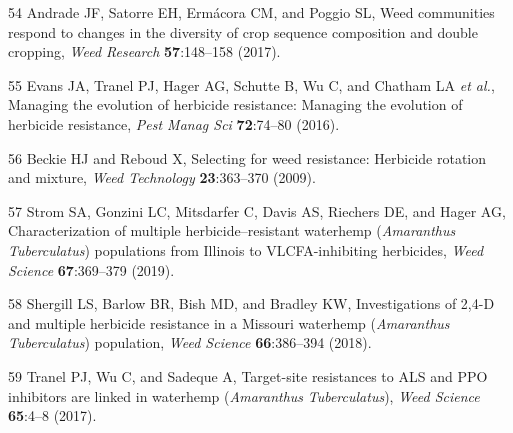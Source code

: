 \documentclass[
  12pt,
  a4paper]{article}
\begin{document}
\leavevmode\hypertarget{ref-andrade_weed_2017}{}%
54 Andrade JF, Satorre EH, Ermácora CM, and Poggio SL, Weed communities
respond to changes in the diversity of crop sequence composition and
double cropping, \emph{Weed Research} \textbf{57}:148--158 (2017).

\leavevmode\hypertarget{ref-evans_managing_2016}{}%
55 Evans JA, Tranel PJ, Hager AG, Schutte B, Wu C, and Chatham LA
\emph{et al.}, Managing the evolution of herbicide resistance: Managing
the evolution of herbicide resistance, \emph{Pest Manag Sci}
\textbf{72}:74--80 (2016).

\leavevmode\hypertarget{ref-beckie_selecting_2009}{}%
56 Beckie HJ and Reboud X, Selecting for weed resistance: Herbicide
rotation and mixture, \emph{Weed Technology} \textbf{23}:363--370
(2009).

\leavevmode\hypertarget{ref-strom_characterization_2019}{}%
57 Strom SA, Gonzini LC, Mitsdarfer C, Davis AS, Riechers DE, and Hager
AG, Characterization of multiple herbicide--resistant waterhemp
(\emph{Amaranthus} \emph{Tuberculatus}) populations from Illinois to
VLCFA-inhibiting herbicides, \emph{Weed Science} \textbf{67}:369--379
(2019).

\leavevmode\hypertarget{ref-shergill_investigations_2018}{}%
58 Shergill LS, Barlow BR, Bish MD, and Bradley KW, Investigations of
2,4-D and multiple herbicide resistance in a Missouri waterhemp
(\emph{Amaranthus} \emph{Tuberculatus}) population, \emph{Weed Science}
\textbf{66}:386--394 (2018).

\leavevmode\hypertarget{ref-tranel_target-site_2017}{}%
59 Tranel PJ, Wu C, and Sadeque A, Target-site resistances to ALS and
PPO inhibitors are linked in waterhemp (\emph{Amaranthus}
\emph{Tuberculatus}), \emph{Weed Science} \textbf{65}:4--8 (2017).
\end{document}
